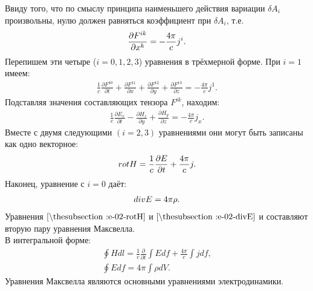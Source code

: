 \documentclass[__main__.tex]{subfiles}
\begin{document}
Ввиду того, что по смыслу принципа наименьшего действия вариации $\delta A_i$ произвольны, нулю должен равняться коэффициент при $\delta A_i$, т.е.
\begin{gather}
	\llabel{e-02-deltaF}
	\frac{\partial F^{ik}}{\partial x^k} = -\frac{4\pi}{c}j^i.
\end{gather}
Перепишем эти четыре ($i = 0, 1, 2, 3$) уравнения в трёхмерной форме. При $i=1$ имеем:
\begin{gather*}
	\frac{1}{c}\frac{\partial F^{10}}{\partial t} + \frac{\partial F^{11}}{\partial x} + \frac{\partial F^{12}}{\partial y} + \frac{\partial F^{13}}{\partial z} = -\frac{4\pi}{c}j^1.
\end{gather*}
Подставляя значения составляющих тензора $F^{ik}$, находим:
\begin{gather*}
	\frac{1}{c}\frac{\partial E_x}{\partial t} - \frac{\partial H_z}{\partial y} + \frac{\partial H_y}{\partial z} = -\frac{4\pi}{c}j_x.
\end{gather*}
Вместе с двумя следующими $(i = 2, 3)$ уравнениями они могут быть записаны как одно векторное:
\begin{gather}
	\llabel{e-02-rotH}
	rot H = \frac{1}{c}\frac{\partial E}{\partial t} + \frac{4\pi}{c}j.
\end{gather}
Наконец, уравнение с $i=0$ даёт:
\begin{gather}
	\llabel{e-02-divE}
	div E = 4\pi\rho.
\end{gather}
Уравнения $\lref{e-02-rotH}$ и $\lref{e-02-divE}$ и составляют вторую пару уравнения Максвелла.\\
В интегральной форме:\\
\begin{gather*}
	\oint Hdl = \frac{1}{c}\frac{\partial}{\partial t}\int Edf + \frac{4\pi}{c}\int jdf,\\
	\oint Edf = 4\pi\int \rho dV.
\end{gather*}
Уравнения Максвелла являются основными уравнениями электродинамики.\\
\end{document}
